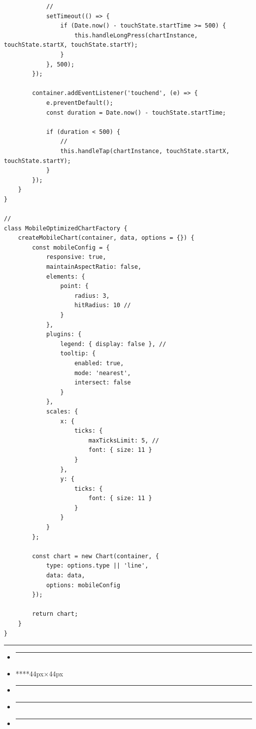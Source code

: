 \begin{verbatim}
            // 
            setTimeout(() => {
                if (Date.now() - touchState.startTime >= 500) {
                    this.handleLongPress(chartInstance, touchState.startX, touchState.startY);
                }
            }, 500);
        });
        
        container.addEventListener('touchend', (e) => {
            e.preventDefault();
            const duration = Date.now() - touchState.startTime;
            
            if (duration < 500) {
                // 
                this.handleTap(chartInstance, touchState.startX, touchState.startY);
            }
        });
    }
}

// 
class MobileOptimizedChartFactory {
    createMobileChart(container, data, options = {}) {
        const mobileConfig = {
            responsive: true,
            maintainAspectRatio: false,
            elements: {
                point: {
                    radius: 3,
                    hitRadius: 10 // 
                }
            },
            plugins: {
                legend: { display: false }, // 
                tooltip: {
                    enabled: true,
                    mode: 'nearest',
                    intersect: false
                }
            },
            scales: {
                x: {
                    ticks: {
                        maxTicksLimit: 5, // 
                        font: { size: 11 }
                    }
                },
                y: {
                    ticks: {
                        font: { size: 11 }
                    }
                }
            }
        };
        
        const chart = new Chart(container, {
            type: options.type || 'line',
            data: data,
            options: mobileConfig
        });
        
        return chart;
    }
}
\end{verbatim}

\begin{center}\rule{0.5\linewidth}{0.5pt}\end{center}

\begin{itemize}
\item
  \begin{center}\rule{0.5\linewidth}{0.5pt}\end{center}
\item
  ****44px×44px
\item
  \begin{center}\rule{0.5\linewidth}{0.5pt}\end{center}
\item
  \begin{center}\rule{0.5\linewidth}{0.5pt}\end{center}
\item
  \begin{center}\rule{0.5\linewidth}{0.5pt}\end{center}
\end{itemize}

